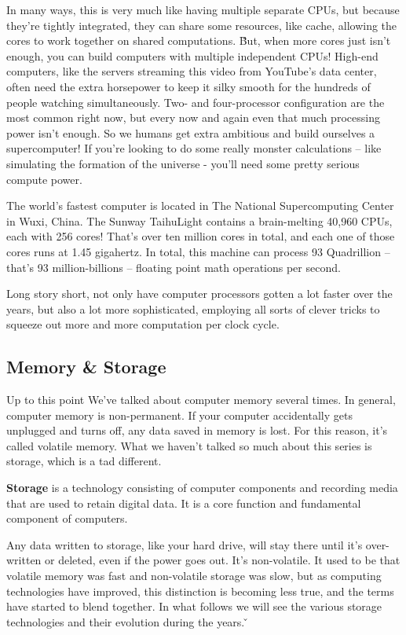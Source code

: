 In many ways, this is very much like having multiple separate CPUs, but because they're tightly integrated, they can
share some resources, like cache, allowing the cores to work together on shared computations. \v

But, when more cores just isn't enough, you can build computers with multiple independent CPUs! High-end computers,
like the servers streaming this video from YouTube's data center, often need the extra horsepower to keep it silky
smooth for the hundreds of people watching simultaneously. Two- and four-processor configuration are the most common
right now, but every now and again even that much processing power isn't enough. So we humans get extra ambitious and
build ourselves a supercomputer! If you're looking to do some really monster calculations – like simulating the
formation of the universe - you'll need some pretty serious compute power.

\be
The world's fastest computer is located in The National Supercomputing Center in Wuxi, China. The Sunway TaihuLight
contains a brain-melting 40,960 CPUs, each with 256 cores! That's over ten million cores in total, and each one of
those cores runs at 1.45 gigahertz. In total, this machine can process 93 Quadrillion -- that's 93 million-billions
-- floating point math operations per second.
\ee

Long story short, not only have computer processors gotten a lot faster over the years, but also a lot more
sophisticated, employing all sorts of clever tricks to squeeze out more and more computation per clock cycle.

\subsection{Memory \& Storage}

Up to this point We've talked about computer memory several times. In general, computer memory is non-permanent. If
your computer accidentally gets unplugged and turns off, any data saved in memory is lost. For this reason, it's
called volatile memory. What we haven't talked so much about this series is storage, which is a tad different.

\bd[Storage]
\textbf{Storage} is a technology consisting of computer components and recording media that are used to retain
digital data. It is a core function and fundamental component of computers.
\ed

Any data written to storage, like your hard drive, will stay there until it's over-written or deleted, even if the
power goes out. It's non-volatile. It used to be that volatile memory was fast and non-volatile storage was slow, but
as computing technologies have improved, this distinction is becoming less true, and the terms have started to blend
together. In what follows we will see the various storage technologies and their evolution during the years. \v

